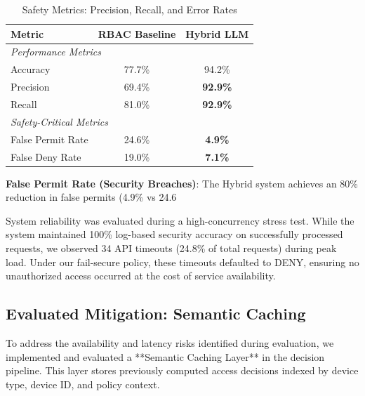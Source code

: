 \documentclass[conference]{IEEEtran}
\begin{document}
\begin{table}[h]
    \centering
    \caption{Safety Metrics: Precision, Recall, and Error Rates}
    \label{tab:safety_metrics}
    \begin{tabular}{lcc}
        \toprule
        \textbf{Metric}   & \textbf{RBAC Baseline} & \textbf{Hybrid LLM} \\
        \midrule
        \multicolumn{3}{l}{\textit{Performance Metrics}}                 \\
        Accuracy          & 77.7\%                 & 94.2\%              \\
        Precision         & 69.4\%                 & \textbf{92.9\%}     \\
        Recall            & 81.0\%                 & \textbf{92.9\%}     \\
        \midrule
        \multicolumn{3}{l}{\textit{Safety-Critical Metrics}}             \\
        False Permit Rate & 24.6\%                 & \textbf{4.9\%}      \\
        False Deny Rate   & 19.0\%                 & \textbf{7.1\%}      \\
        \bottomrule
    \end{tabular}
\end{table}

\textbf{False Permit Rate (Security Breaches)}: The Hybrid system achieves an 80\% reduction in false permits (4.9\% vs 24.6%

System reliability was evaluated during a high-concurrency stress test. While the system maintained 100\% log-based security accuracy on successfully processed requests, we observed 34 API timeouts (24.8\% of total requests) during peak load. Under our fail-secure policy, these timeouts defaulted to DENY, ensuring no unauthorized access occurred at the cost of service availability.

\subsection{Evaluated Mitigation: Semantic Caching}

To address the availability and latency risks identified during evaluation, we implemented and evaluated a **Semantic Caching Layer** in the decision pipeline. This layer stores previously computed access decisions indexed by device type, device ID, and policy context. 
\end{document}
